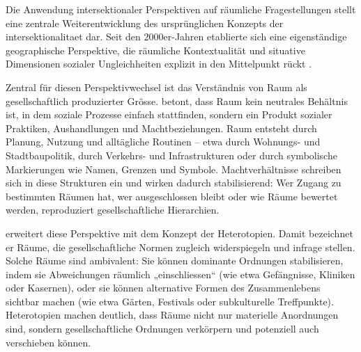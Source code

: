 \vspace{2em}

Die Anwendung intersektionaler Perspektiven auf räumliche Fragestellungen stellt eine zentrale Weiterentwicklung des ursprünglichen Konzepts der \gls{intersektionalitaet} dar. Seit den 2000er-Jahren etablierte sich eine eigenständige geographische Perspektive, die räumliche Kontextualität und situative Dimensionen sozialer Ungleichheiten explizit in den Mittelpunkt rückt \parencite{valentineTheorizingResearchingIntersectionality2007,rodo-de-zarateIntersectionalityFeministGeographies2018}.

Zentral für diesen Perspektivwechsel ist das Verständnis von Raum als gesellschaftlich produzierter Grösse. \textcite{lefebvreProductionLespace1974} betont, dass Raum kein neutrales Behältnis ist, in dem soziale Prozesse einfach stattfinden, sondern ein Produkt sozialer Praktiken, Aushandlungen und Machtbeziehungen. Raum entsteht durch Planung, Nutzung und alltägliche Routinen -- etwa durch Wohnungs- und Stadtbaupolitik, durch Verkehrs- und Infrastrukturen oder durch symbolische Markierungen wie Namen, Grenzen und Symbole. Machtverhältnisse schreiben sich in diese Strukturen ein und wirken dadurch stabilisierend: Wer Zugang zu bestimmten Räumen hat, wer ausgeschlossen bleibt oder wie Räume bewertet werden, reproduziert gesellschaftliche Hierarchien.

\textcite{foucaultEspacesAutres2004} erweitert diese Perspektive mit dem Konzept der Heterotopien. Damit bezeichnet er Räume, die gesellschaftliche Normen zugleich widerspiegeln und infrage stellen. Solche Räume sind ambivalent: Sie können dominante Ordnungen stabilisieren, indem sie Abweichungen räumlich „einschliessen“ (wie etwa Gefängnisse, Kliniken oder Kasernen), oder sie können alternative Formen des Zusammenlebens sichtbar machen (wie etwa Gärten, Festivals oder subkulturelle Treffpunkte). Heterotopien machen deutlich, dass Räume nicht nur materielle Anordnungen sind, sondern gesellschaftliche Ordnungen verkörpern und potenziell auch verschieben können.

